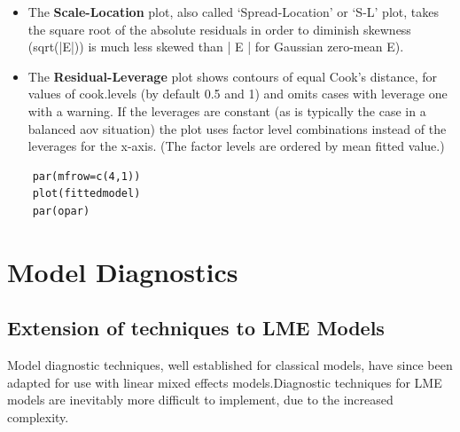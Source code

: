 \documentclass[a4paper,12pt]{article}
\begin{document}
\begin{itemize}
	\item
	The \textbf{Scale-Location} plot, also called ‘Spread-Location’ or ‘S-L’ plot, takes the square root of the absolute residuals in order to diminish skewness (sqrt(|E|)) is much less skewed than | E | for Gaussian zero-mean E).
	
	\item
	The \textbf{Residual-Leverage} plot shows contours of equal Cook's distance, for values of cook.levels (by default 0.5 and 1) and omits cases with leverage one with a warning. If the leverages are constant (as is typically the case in a balanced aov situation) the plot uses factor level combinations instead of the leverages for the x-axis. (The factor levels are ordered by mean fitted value.)
\end{itemize}
\begin{framed}
	\begin{verbatim}
	par(mfrow=c(4,1))
	plot(fittedmodel)
	par(opar)
	\end{verbatim}
\end{framed}


\chapter{Model Diagnostics}

\section{Extension of techniques to LME Models} %

Model diagnostic techniques, well established for classical models, have since been adapted for use with linear mixed effects models.Diagnostic techniques for LME models are inevitably more difficult to implement, due to the increased complexity.
\end{document}
